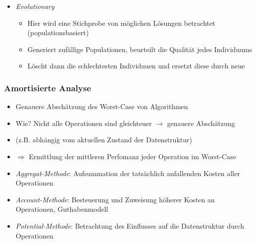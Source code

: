 \begin{itemize}
                \item \textit{Evolutionary}
                    \begin{itemize}
                        \item Hier wird eine Stichprobe von möglichen Lösungen betrachtet (populationsbasiert)
                        \item Generiert zufällige Populationen, beurteilt die Qualität jedes Individuums
                        \item Löscht dann die schlechtesten Individuuen und ersetzt diese durch neue
                    \end{itemize}
            \end{itemize}

        \subsubsection{Amortisierte Analyse}
            \begin{itemize}
                \item Genauere Abschätzung des Worst-Case von Algorithmen
                \item Wie? Nicht alle Operationen sind gleichteuer $\rightarrow$ genauere Abschätzung
                \item[] (z.B. abhängig vom aktuellen Zustand der Datenstruktur)
                \item[] $\Rightarrow$ Ermittlung der mittleren Perfomanz jeder Operation im Worst-Case
                \item \textit{Aggregat-Methode}: Aufsummation der tatsächlich anfallenden Kosten aller Operationen
                \item \textit{Account-Methode}: Besteuerung und Zuweisung höherer Kosten an Operationen, Guthabenmodell
                \item \textit{Potential-Methode}: Betrachtung des Einflusses auf die Datenstruktur durch Operationen 
            \end{itemize}

